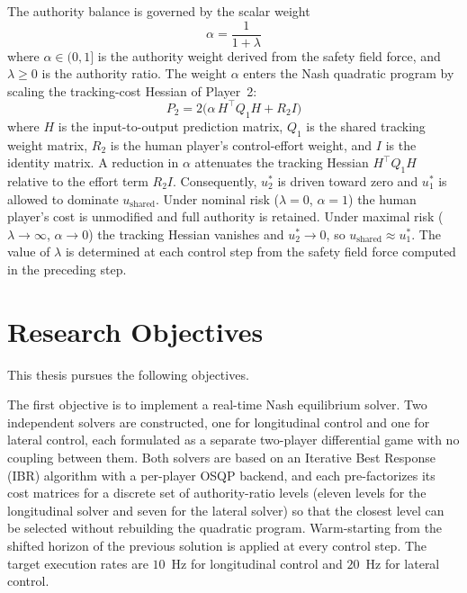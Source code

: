 \documentclass[12pt,a4paper,oneside]{report}
\begin{document}
The authority balance is governed by the scalar weight
\begin{equation}
\alpha = \frac{1}{1 + \lambda}
\label{eq:alpha_lambda}
\end{equation}
where $\alpha \in (0,1]$ is the authority weight derived from the safety field force,
and $\lambda \geq 0$ is the authority ratio. The weight $\alpha$ enters the Nash
quadratic program by scaling the tracking-cost Hessian of Player~2:
\begin{equation}
P_2 = 2\bigl(\alpha\, H^{\top}Q_1 H + R_2 I\bigr)
\label{eq:P2_alpha}
\end{equation}
where $H$ is the input-to-output prediction matrix, $Q_1$ is the shared tracking weight
matrix, $R_2$ is the human player's control-effort weight, and $I$ is the identity matrix.
A reduction in $\alpha$ attenuates the tracking Hessian $H^{\top}Q_1 H$ relative to the
effort term $R_2 I$. Consequently, $u_2^*$ is driven toward zero and $u_1^*$ is allowed
to dominate $u_{\text{shared}}$. Under nominal risk ($\lambda = 0$, $\alpha = 1$) the human
player's cost is unmodified and full authority is retained. Under maximal risk
($\lambda \to \infty$, $\alpha \to 0$) the tracking Hessian vanishes and
$u_2^* \to 0$, so $u_{\text{shared}} \approx u_1^*$. The value of $\lambda$ is
determined at each control step from the safety field force computed in the preceding
step.

\section{Research Objectives}

This thesis pursues the following objectives.

The first objective is to implement a real-time Nash equilibrium solver. Two
independent solvers are constructed, one for longitudinal control and one for
lateral control, each formulated as a separate two-player differential game with no
coupling between them. Both solvers are based on an Iterative Best Response (IBR)
algorithm with a per-player OSQP backend, and each pre-factorizes its cost matrices
for a discrete set of authority-ratio levels (eleven levels for the longitudinal
solver and seven for the lateral solver) so that the closest level can be selected
without rebuilding the quadratic program. Warm-starting from the shifted horizon
of the previous solution is applied at every control step. The target execution
rates are $10$\, Hz for longitudinal control and $20$\, Hz for lateral control.
\end{document}
